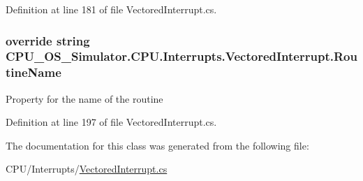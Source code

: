 Definition at line 181 of file Vectored\+Interrupt.\+cs.

\hypertarget{class_c_p_u___o_s___simulator_1_1_c_p_u_1_1_interrupts_1_1_vectored_interrupt_adf0b02aced85f32cec631b946a6d024d}{}
\subsubsection[{Routine\+Name}]{\setlength{\rightskip}{0pt plus 5cm}override string C\+P\+U\+\_\+\+O\+S\+\_\+\+Simulator.\+C\+P\+U.\+Interrupts.\+Vectored\+Interrupt.\+Routine\+Name\hspace{0.3cm}{\ttfamily [get]}}\label{class_c_p_u___o_s___simulator_1_1_c_p_u_1_1_interrupts_1_1_vectored_interrupt_adf0b02aced85f32cec631b946a6d024d}


Property for the name of the routine 



Definition at line 197 of file Vectored\+Interrupt.\+cs.



The documentation for this class was generated from the following file\+:\begin{DoxyCompactItemize}
\item 
C\+P\+U/\+Interrupts/\hyperlink{_vectored_interrupt_8cs}{Vectored\+Interrupt.\+cs}\end{DoxyCompactItemize}
